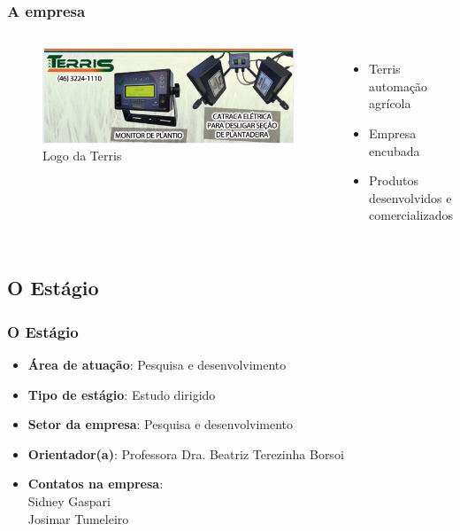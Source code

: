 \begin{frame}%
\frametitle{A empresa}
\begin{columns}

	\begin{figure}[]
	 \centering
	 \captionsetup{width=\textwidth,font=footnotesize,textfont=bf}
	 \includegraphics[width=\textwidth,keepaspectratio]{Figuras/Terris.jpg}
	 \caption{Logo da Terris}
	\end{figure}
	
	\begin{itemize}
	\item Terris automação agrícola
	\pause
	\item Empresa encubada
	\pause
	\item Produtos desenvolvidos e comercializados
	\end{itemize}

\end{columns}
\end{frame}

\subsection{O Estágio}

\begin{frame}
\frametitle{O Estágio}

\begin{itemize}
	\item \textbf{Área de atuação}: Pesquisa e desenvolvimento
	\pause
	\item \textbf{Tipo de estágio}: Estudo dirigido
	\pause
	\item \textbf{Setor da empresa}: Pesquisa e desenvolvimento
	\pause	
	\item \textbf{Orientador(a)}: Professora Dra. Beatriz Terezinha Borsoi
	\pause
	\item \textbf{Contatos na empresa}: \\Sidney Gaspari\\ Josimar Tumeleiro
\end{itemize}
\end{frame}

